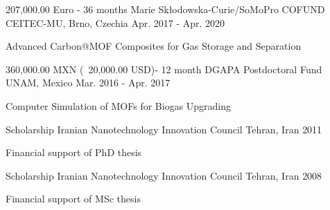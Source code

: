
\begin{cventries}

    \cventry
    {207,000.00 Euro - 36 months} %
    {Marie Skłodowska-Curie/SoMoPro COFUND} %
    {CEITEC-MU, Brno, Czechia} %
    {Apr. 2017 - Apr. 2020} %
    {
      \begin{cvitems} %
        \item {Advanced Carbon{@}MOF Composites for Gas Storage and Separation}
      \end{cvitems}
    }
    \cventry
    {360,000.00 MXN (~20,000.00 USD)- 12 month} %
    {DGAPA Postdoctoral Fund} %
    {UNAM, Mexico} %
    {Mar. 2016 - Apr. 2017} %
    {
      \begin{cvitems} %
        \item {Computer Simulation of MOFs for Biogas Upgrading}
      \end{cvitems}
    }
    \cventry
    {Scholarship} %
    {Iranian Nanotechnology Innovation Council} %
    {Tehran, Iran} %
    {2011} %
    {
      \begin{cvitems} %
        \item {Financial support of PhD thesis}
      \end{cvitems}
    }
    
    \cventry
    {Scholarship} %
    {Iranian Nanotechnology Innovation Council} %
    {Tehran, Iran} %
    {2008} %
    {
      \begin{cvitems} %
        \item {Financial support of MSc thesis}
      \end{cvitems}
    }
 \clearpage
\end{cventries}
